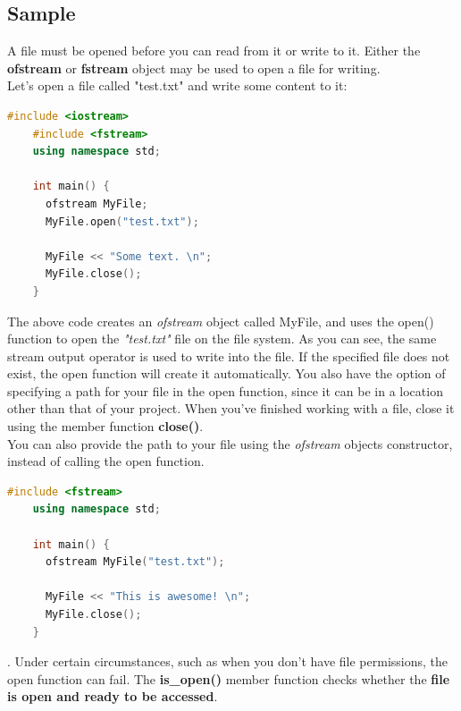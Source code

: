 \documentclass[12pt , a4paper]{article}
\newcommand{\hl}[1]{\colorbox{coolblack}{\color{cream}\textbf{#1}\color{black}}}
\begin{document}
	\subsection{Sample}
	A file must be opened before you can read from it or write to it.
	Either the \textbf{ofstream} or \textbf{fstream} object may be used to open a file for writing.\\
	Let's open a file called "test.txt" and write some content to it:
	\begin{lstlisting}[language=C++]
	#include <iostream>
	#include <fstream>
	using namespace std;
	
	int main() {
	  ofstream MyFile;
	  MyFile.open("test.txt");
	
	  MyFile << "Some text. \n";
	  MyFile.close();
	}		
	\end{lstlisting}
	The above code creates an \emph{ofstream} object called MyFile, and uses the open() function to open the \emph{"test.txt"} file on the file system. As you can see, the same stream output operator is used to write into the file. If the specified file does not exist, the open function will create it automatically. You also have the option of specifying a path for your file in the open function, since it can be in a location other than that of your project. When you've finished working with a file, close it using the member function \hl{close()}.\\
You can also provide the path to your file using the \emph{ofstream} objects constructor, instead of calling the open function.
	\begin{lstlisting}[language=C++]
	#include <fstream>
	using namespace std;
	
	int main() {
	  ofstream MyFile("test.txt");
	
	  MyFile << "This is awesome! \n";
	  MyFile.close();
	}		
	\end{lstlisting}.
Under certain circumstances, such as when you don't have file permissions, the open function can fail.
The \hl{is\_open()} member function checks whether the \textbf{file is open and ready to be accessed}.\\
\end{document}
